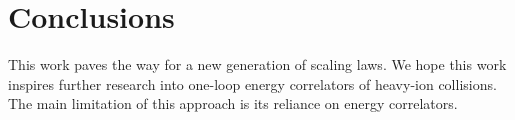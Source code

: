 \section{Conclusions}\label{sec:conclusions}

This work paves the way for a new generation of scaling laws. We hope
this work inspires further research into one-loop energy correlators of
heavy-ion collisions. The main limitation of this approach is its
reliance on energy correlators.

